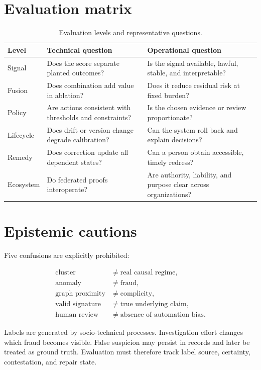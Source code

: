 \section{Evaluation matrix}

\begin{table}[htbp]
\centering
\caption{Evaluation levels and representative questions.}
\begin{tabularx}{\textwidth}{p{31mm}YY}
\toprule
Level & Technical question & Operational question\\
\midrule
Signal & Does the score separate planted outcomes? & Is the signal available, lawful, stable, and interpretable?\\
Fusion & Does combination add value in ablation? & Does it reduce residual risk at fixed burden?\\
Policy & Are actions consistent with thresholds and constraints? & Is the chosen evidence or review proportionate?\\
Lifecycle & Does drift or version change degrade calibration? & Can the system roll back and explain decisions?\\
Remedy & Does correction update all dependent states? & Can a person obtain accessible, timely redress?\\
Ecosystem & Do federated proofs interoperate? & Are authority, liability, and purpose clear across organizations?\\
\bottomrule
\end{tabularx}
\end{table}

\section{Epistemic cautions}

Five confusions are explicitly prohibited:

\begin{align}
\text{cluster} &\neq \text{real causal regime},\\
\text{anomaly} &\neq \text{fraud},\\
\text{graph proximity} &\neq \text{complicity},\\
\text{valid signature} &\neq \text{true underlying claim},\\
\text{human review} &\neq \text{absence of automation bias}.
\end{align}

Labels are generated by socio-technical processes. Investigation effort changes which fraud becomes visible. False suspicion may persist in records and later be treated as ground truth. Evaluation must therefore track label source, certainty, contestation, and repair state.
